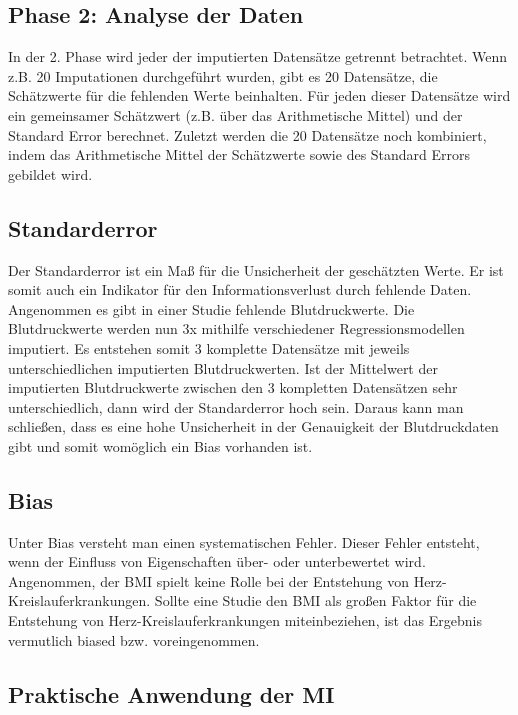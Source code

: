 \subsection{Phase 2: Analyse der Daten}

In der 2. Phase wird jeder der imputierten Datensätze getrennt betrachtet. Wenn z.B. 20 Imputationen durchgeführt wurden, 
gibt es 20 Datensätze, die Schätzwerte für die fehlenden Werte beinhalten. Für jeden dieser Datensätze wird ein gemeinsamer 
Schätzwert (z.B. über das Arithmetische Mittel) und der Standard Error berechnet. Zuletzt werden die 20 Datensätze noch 
kombiniert, indem das Arithmetische Mittel der Schätzwerte sowie des Standard Errors gebildet wird. \autocite[10]{Enders2017}

\subsection{Standarderror}

Der Standarderror ist ein Maß für die Unsicherheit der 
geschätzten Werte. \autocite[1098]{Donders2006} Er ist somit auch ein Indikator für den Informationsverlust durch fehlende Daten. \autocite[1298]{Hughes2019}
Angenommen es gibt in einer Studie fehlende Blutdruckwerte. Die Blutdruckwerte werden nun 3x mithilfe verschiedener Regressionsmodellen imputiert.
Es entstehen somit 3 komplette Datensätze mit jeweils unterschiedlichen imputierten Blutdruckwerten. Ist der Mittelwert der imputierten Blutdruckwerte zwischen den 3 kompletten
Datensätzen sehr unterschiedlich, dann wird der Standarderror hoch sein. Daraus kann man schließen, dass es eine hohe Unsicherheit in der Genauigkeit der Blutdruckdaten gibt und
somit womöglich ein Bias vorhanden ist.   

\subsection{Bias}

Unter Bias versteht man einen systematischen Fehler. Dieser Fehler entsteht, 
wenn der Einfluss von Eigenschaften über- oder unterbewertet wird. \autocite[2]{Jakobsen2017} Angenommen, der BMI 
spielt keine Rolle bei der Entstehung von Herz-Kreislauferkrankungen. Sollte eine Studie den BMI als großen Faktor 
für die Entstehung von Herz-Kreislauferkrankungen miteinbeziehen, ist das Ergebnis vermutlich biased bzw. voreingenommen.

\subsection{Praktische Anwendung der MI}

